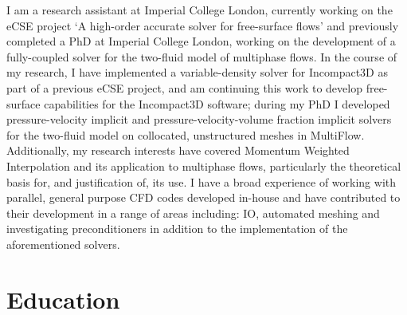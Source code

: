\documentclass[10pt,a4paper]{moderncv} %
\begin{document}
\makecvtitle %
\vspace{-0.6cm}


I am a research assistant at Imperial College London, currently working on the eCSE project `A
high-order accurate solver for free-surface flows' and previously completed a PhD at Imperial
College London, working on the development of a fully-coupled solver for the two-fluid model of
multiphase flows.
In the course of my research, I have implemented a variable-density solver for Incompact3D as part
of a previous eCSE project, and am continuing this work to develop free-surface capabilities for the
Incompact3D software; during my PhD I developed pressure-velocity implicit and
pressure-velocity-volume fraction implicit solvers for the two-fluid model on collocated,
unstructured meshes in MultiFlow.
Additionally, my research interests have covered Momentum Weighted Interpolation and its application
to multiphase flows, particularly the theoretical basis for, and justification of, its use.
I have a broad experience of working with parallel, general purpose CFD codes developed in-house and
have contributed to their development in a range of areas including: IO, automated meshing and
investigating preconditioners in addition to the implementation of the aforementioned solvers.
\\


\section{Education}

\end{document}
